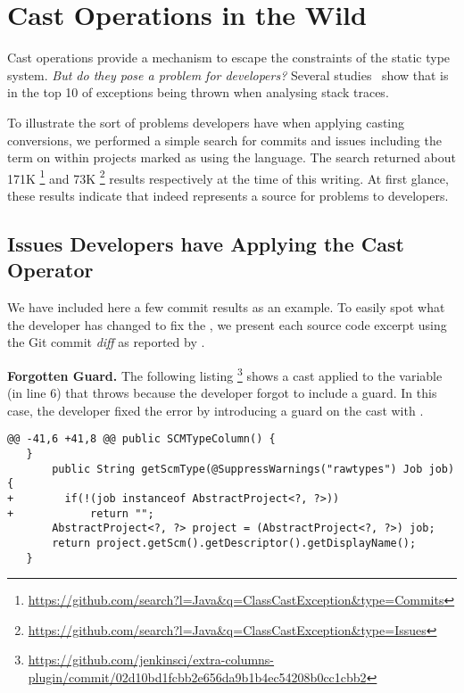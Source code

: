 
\chapter{Cast Operations in the Wild}
\label{cha:casts}

Cast operations provide a mechanism to escape the constraints of the static type system.
\emph{But do they pose a problem for developers?}
Several studies~\citep{kechagiaUndocumentedUncheckedExceptions2014,coelhoUnveilingExceptionHandling2015,zhitnitskyTop10Exception2016} show that  is in the top 10 of exceptions being
thrown when analysing stack traces.

To illustrate the sort of problems developers have when applying casting conversions, we performed a simple search for commits and issues including the term  on \github{} within projects marked as using the \java{} language.
The search returned about 171K%
\footnote{\url{https://github.com/search?l=Java&q=ClassCastException&type=Commits}}
and 73K%
\footnote{\url{https://github.com/search?l=Java&q=ClassCastException&type=Issues}}
results respectively at the time of this writing.
At first glance, these results indicate that indeed  represents a source for problems to developers.

\section{Issues Developers have Applying the Cast Operator}

We have included here a few commit results as an example.
To easily spot what the developer has changed to fix the , we present each source code excerpt using the Git commit \emph{diff} as reported by \github{}.

\textbf{Forgotten Guard.}
The following listing%
\footnote{\url{https://github.com/jenkinsci/extra-columns-plugin/commit/02d10bd1fcbb2e656da9b1b4ec54208b0cc1cbb2}}
shows a cast applied to the variable  (in line 6) that throws  because the developer forgot to include a guard.
In this case, the developer fixed the error by introducing a guard on the cast with .

\begin{lstlisting}[style=java]
@@ -41,6 +41,8 @@ public SCMTypeColumn() {
   }
       public String getScmType(@SuppressWarnings("rawtypes") Job job) {
+        if(!(job instanceof AbstractProject<?, ?>))
+            return "";
       AbstractProject<?, ?> project = (AbstractProject<?, ?>) job;
       return project.getScm().getDescriptor().getDisplayName();
   }
\end{lstlisting}

